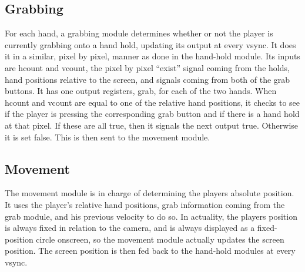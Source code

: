 \subsection{Grabbing}

For each hand, a grabbing module determines whether or not the player is
currently grabbing onto a hand hold, updating its output at every vsync. It does
it in a similar, pixel by pixel, manner as done in the hand-hold module. Its
inputs are hcount and vcount, the pixel by pixel “exist” signal coming from the
holds, hand positions relative to the screen, and signals coming from both of
the grab buttons. It has one output registers, grab, for each of the two hands.
When hcount and vcount are equal to one of the relative hand positions, it
checks to see if the player is pressing the corresponding grab button and if
there is a hand hold at that pixel. If these are all true, then it signals the
next output true. Otherwise it is set false. This is then sent to the movement
module.

\subsection{Movement}

The movement module is in charge of determining the players absolute position.
It uses the player's relative hand positions, grab information coming from the
grab module, and his previous velocity to do so. In actuality, the players
position is always fixed in relation to the camera, and is always displayed as a
fixed-position circle onscreen, so the movement module actually updates the
screen position. The screen position is then fed back to the hand-hold modules
at every vsync.

